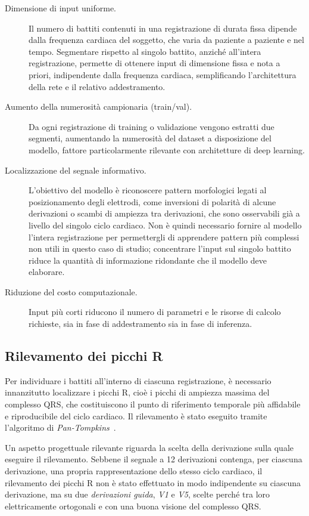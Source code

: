 \begin{description}
	\item[Dimensione di input uniforme.] Il numero di battiti contenuti in una registrazione di durata fissa dipende dalla frequenza cardiaca del soggetto, che varia da paziente a paziente e nel tempo. Segmentare rispetto al singolo battito, anziché all'intera registrazione, permette di ottenere input di dimensione fissa e nota a priori, indipendente dalla frequenza cardiaca, semplificando l'architettura della rete e il relativo addestramento.
	\item[Aumento della numerosità campionaria (train/val).] Da ogni registrazione di training o validazione vengono estratti due segmenti, aumentando la numerosità del dataset a disposizione del modello, fattore particolarmente rilevante con architetture di deep learning.
	\item[Localizzazione del segnale informativo.] L'obiettivo del modello è riconoscere pattern morfologici legati al posizionamento degli elettrodi, come inversioni di polarità di alcune derivazioni o scambi di ampiezza tra derivazioni, che sono osservabili già a livello del singolo ciclo cardiaco. Non è quindi necessario fornire al modello l'intera registrazione per permettergli di apprendere pattern più complessi non utili in questo caso di studio; concentrare l'input sul singolo battito riduce la quantità di informazione ridondante che il modello deve elaborare.
	\item[Riduzione del costo computazionale.] Input più corti riducono il numero di parametri e le risorse di calcolo richieste, sia in fase di addestramento sia in fase di inferenza.
\end{description}

\subsection{Rilevamento dei picchi R}

Per individuare i battiti all'interno di ciascuna registrazione, è necessario innanzitutto localizzare i picchi R, cioè i picchi di ampiezza massima del complesso QRS, che costituiscono il punto di riferimento temporale più affidabile e riproducibile del ciclo cardiaco. Il rilevamento è stato eseguito tramite l'algoritmo di \textit{Pan-Tompkins}~\cite{pantompkins1985}.

Un aspetto progettuale rilevante riguarda la scelta della derivazione sulla quale eseguire il rilevamento. Sebbene il segnale a 12 derivazioni contenga, per ciascuna derivazione, una propria rappresentazione dello stesso ciclo cardiaco, il rilevamento dei picchi R non è stato effettuato in modo indipendente su ciascuna derivazione, ma su due \textit{derivazioni guida}, \textit{V1} e \textit{V5}, scelte perché tra loro elettricamente ortogonali e con una buona visione del complesso QRS.

